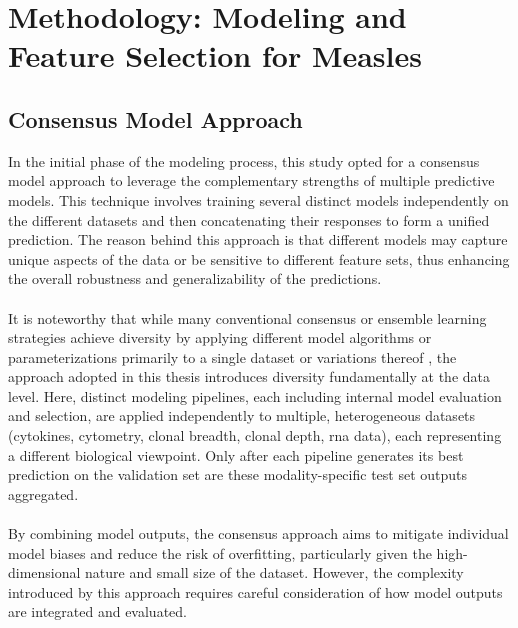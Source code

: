 \documentclass[12pt,a4paper]{report}
\newcommand{\todo}[1]{%
  \par\noindent%
  \begin{tcolorbox}[colback=yellow, colframe=black, boxrule=0.5pt, sharp corners, width=\linewidth, before skip=5pt, after skip=5pt]
    \textbf{TODO:} #1
  \end{tcolorbox}%
  \par
}
\begin{document}
\chapter{Methodology: Modeling and Feature Selection for Measles}
\label{chap:methodology}
\section{Consensus Model Approach}
\label{sec:consensus_model_approach}
\noindent
In the initial phase of the modeling process, this study opted for a consensus model approach to leverage the complementary strengths of multiple predictive models. This technique involves training several distinct models independently on the different datasets and then concatenating their responses to form a unified prediction. The reason behind this approach is that different models may capture unique aspects of the data or be sensitive to different feature sets, thus enhancing the overall robustness and generalizability of the predictions.\\
\\
It is noteworthy that while many conventional consensus or ensemble learning strategies achieve diversity by applying different model algorithms or parameterizations primarily to a single dataset or variations thereof \cite{Rokach2010}, the approach adopted in this thesis introduces diversity fundamentally at the data level. Here, distinct modeling pipelines, each including internal model evaluation and selection, are applied independently to multiple, heterogeneous datasets (cytokines, cytometry, clonal breadth, clonal depth, \acrshort{rna} data), each representing a different biological viewpoint. Only after each pipeline generates its best prediction on the validation set are these modality-specific test set outputs aggregated.\\
\\
By combining model outputs, the consensus approach aims to mitigate individual model biases and reduce the risk of overfitting, particularly given the high-dimensional nature and small size of the dataset. However, the complexity introduced by this approach requires careful consideration of how model outputs are integrated and evaluated.
\end{document}
